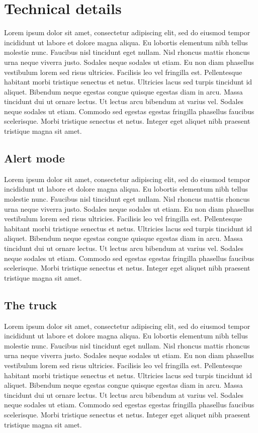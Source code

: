 \documentclass[]{article}
\begin{document}
\section{Technical details}
Lorem ipsum dolor sit amet, consectetur adipiscing elit, sed do eiusmod tempor incididunt ut labore et dolore magna aliqua. Eu lobortis elementum nibh tellus molestie nunc. Faucibus nisl tincidunt eget nullam. Nisl rhoncus mattis rhoncus urna neque viverra justo. Sodales neque sodales ut etiam. Eu non diam phasellus vestibulum lorem sed risus ultricies. Facilisis leo vel fringilla est. Pellentesque habitant morbi tristique senectus et netus. Ultricies lacus sed turpis tincidunt id aliquet. Bibendum neque egestas congue quisque egestas diam in arcu. Massa tincidunt dui ut ornare lectus. Ut lectus arcu bibendum at varius vel. Sodales neque sodales ut etiam. Commodo sed egestas egestas fringilla phasellus faucibus scelerisque. Morbi tristique senectus et netus. Integer eget aliquet nibh praesent tristique magna sit amet.
\subsection{Alert mode}
Lorem ipsum dolor sit amet, consectetur adipiscing elit, sed do eiusmod tempor incididunt ut labore et dolore magna aliqua. Eu lobortis elementum nibh tellus molestie nunc. Faucibus nisl tincidunt eget nullam. Nisl rhoncus mattis rhoncus urna neque viverra justo. Sodales neque sodales ut etiam. Eu non diam phasellus vestibulum lorem sed risus ultricies. Facilisis leo vel fringilla est. Pellentesque habitant morbi tristique senectus et netus. Ultricies lacus sed turpis tincidunt id aliquet. Bibendum neque egestas congue quisque egestas diam in arcu. Massa tincidunt dui ut ornare lectus. Ut lectus arcu bibendum at varius vel. Sodales neque sodales ut etiam. Commodo sed egestas egestas fringilla phasellus faucibus scelerisque. Morbi tristique senectus et netus. Integer eget aliquet nibh praesent tristique magna sit amet.
\subsection{The truck}
Lorem ipsum dolor sit amet, consectetur adipiscing elit, sed do eiusmod tempor incididunt ut labore et dolore magna aliqua. Eu lobortis elementum nibh tellus molestie nunc. Faucibus nisl tincidunt eget nullam. Nisl rhoncus mattis rhoncus urna neque viverra justo. Sodales neque sodales ut etiam. Eu non diam phasellus vestibulum lorem sed risus ultricies. Facilisis leo vel fringilla est. Pellentesque habitant morbi tristique senectus et netus. Ultricies lacus sed turpis tincidunt id aliquet. Bibendum neque egestas congue quisque egestas diam in arcu. Massa tincidunt dui ut ornare lectus. Ut lectus arcu bibendum at varius vel. Sodales neque sodales ut etiam. Commodo sed egestas egestas fringilla phasellus faucibus scelerisque. Morbi tristique senectus et netus. Integer eget aliquet nibh praesent tristique magna sit amet.
\end{document}

